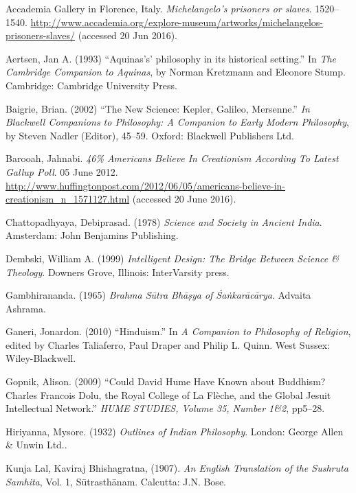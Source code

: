 \newpage

\begin{thebibliography}{99}
\itemsep=2pt
Accademia Gallery in Florence, Italy. {\sl Michelangelo's prisoners or slaves}. 1520--1540. \url{http://www.accademia.org/explore-museum/artworks/michelangelos-prisoners-slaves/} (accessed 20 Jun 2016).

Aertsen, Jan A. (1993) ``Aquinas's' philosophy in its historical setting.'' In {\sl The Cambridge Companion to Aquinas}, by Norman Kretzmann and Eleonore Stump. Cambridge: Cambridge University Press.

Baigrie, Brian. (2002) ``The New Science: Kepler, Galileo, Mersenne.'' {\sl In Blackwell Companions to Philosophy: A Companion to Early Modern Philosophy}, by Steven Nadler (Editor), 45--59. Oxford: Blackwell Publishers Ltd.

Barooah, Jahnabi. {\sl 46\% Americans Believe In Creationism According To Latest Gallup Poll}. 05 June 2012. \url{http://www.huffingtonpost.com/2012/06/05/americans-believe-in-creationism_n_1571127.html} (accessed 20 June 2016).

Chattopadhyaya, Debiprasad. (1978) {\sl Science and Society in Ancient India}. Amsterdam: John Benjamins Publishing.

Dembski, William A. (1999) {\sl Intelligent Design: The Bridge Between Science \& Theology}. Downers Grove, Illinois: InterVarsity press.

Gambhirananda. (1965) {\sl Brahma Sūtra Bhāṣya of Śaṅkarācārya}. Advaita Ashrama.

Ganeri, Jonardon. (2010) ``Hinduism.'' In {\sl A Companion to Philosophy of Religion}, edited by Charles Taliaferro, Paul Draper and Philip L. Quinn. West Sussex: Wiley-Blackwell.

Gopnik, Alison. (2009) ``Could David Hume Have Known about Buddhism? Charles Francois Dolu, the Royal College of La Flèche, and the Global Jesuit Intellectual Network.'' {\sl HUME STUDIES, Volume 35, Number 1\&2}, pp5--28.

Hiriyanna, Mysore. (1932) {\sl Outlines of Indian Philosophy}. London: George Allen \& Unwin Ltd..

Kunja Lal, Kaviraj Bhishagratna, (1907). {\sl An English Translation of the Sushruta Samhita}, Vol. 1, Sūtrasthānam. Calcutta: J.N. Bose.


\end{thebibliography}
